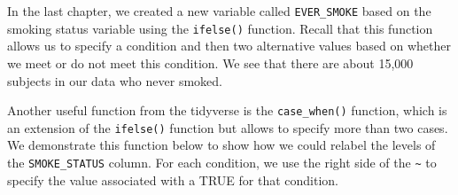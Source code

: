 \documentclass[
  letterpaper,
]{krantz}
\makeatletter
\newenvironment{Shaded}{\begin{snugshade}}{\end{snugshade}}
\newcommand{\CommentTok}[1]{\textcolor[rgb]{0.37,0.37,0.37}{#1}}
\newcommand{\FunctionTok}[1]{\textcolor[rgb]{0.28,0.35,0.67}{#1}}
\newcommand{\NormalTok}[1]{\textcolor[rgb]{0.00,0.23,0.31}{#1}}
\newcommand{\SpecialCharTok}[1]{\textcolor[rgb]{0.37,0.37,0.37}{#1}}
\newcommand{\StringTok}[1]{\textcolor[rgb]{0.13,0.47,0.30}{#1}}
\newenvironment{kframe}{%
\medskip{}
\setlength{\fboxsep}{.8em}
 \def\at@end@of@kframe{}%
 \ifinner\ifhmode%
  \def\at@end@of@kframe{\end{minipage}}%
  \begin{minipage}{\columnwidth}%
 \fi\fi%
 \def\FrameCommand##1{\hskip\@totalleftmargin \hskip-\fboxsep
 \colorbox{shadecolor}{##1}\hskip-\fboxsep
     \hskip-\linewidth \hskip-\@totalleftmargin \hskip\columnwidth}%
 \MakeFramed {\advance\hsize-\width
   \@totalleftmargin\z@ \linewidth\hsize
   \@setminipage}}%
 {\par\unskip\endMakeFramed%
 \at@end@of@kframe}
\renewenvironment{Shaded}{\begin{kframe}}{\end{kframe}}
\makeatother
\begin{document}
In the last chapter, we created a new variable called
\texttt{EVER\_SMOKE} based on the smoking status variable using the
\texttt{ifelse()} function. Recall that this function allows us to
specify a condition and then two alternative values based on whether we
meet or do not meet this condition. We see that there are about 15,000
subjects in our data who never smoked.

\begin{Shaded}
\end{Shaded}

Another useful function from the tidyverse is the \texttt{case\_when()}
function, which is an extension of the \texttt{ifelse()} function but
allows to specify more than two cases. We demonstrate this function
below to show how we could relabel the levels of the
\texttt{SMOKE\_STATUS} column. For each condition, we use the right side
of the \texttt{\textasciitilde{}} to specify the value associated with a
TRUE for that condition.

\begin{Shaded}
\end{Shaded}
\end{document}

